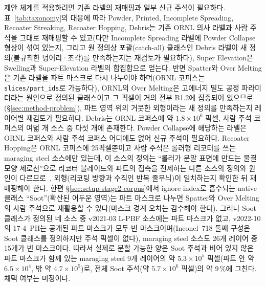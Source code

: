 제안 체계를 적용하려면 기존 라벨의 재매핑과 일부 신규 주석이 필요하다.
표~\ref{tab:taxonomy}의 대응에 따라 Powder, Printed, Incomplete
Spreading, Recoater Streaking, Recoater Hopping, Debris는 기존 ORNL 의사
라벨과 사람 주석을 그대로 재매핑할 수 있고(다만 Incomplete Spreading
라벨에 Powder Collapse 형상이 섞여 있는지, 그리고 원 정의상
포괄(catch-all) 클래스인 Debris 라벨이 새 정의(불규칙한 덩어리·조각)를
만족하는지는 재검토가 필요하다), Super
Elevation은 Swelling과 Super-Elevation 라벨의 합집합으로 얻는다. 반면
Spatter와 Over Melting은 기존 라벨을 파트 마스크로 다시 나누어야
하며(ORNL 코퍼스는 \texttt{slices/part\_ids}로 가능하다), ORNL의 Over
Melting은 고에너지 밀도 공정 파라미터라는 원인으로 정의된 클래스이고 그
픽셀이 거의 전부 B1.2에 집중되어 있으므로(\S\ref{sec:method-problem}),
파트 영역 위의 거뭇한 외형이라는 새 정의를 만족하는지 레이어별 재검토가
필요하다. Debris는
ORNL 코퍼스에 약 $1.8 \times 10^{6}$ 픽셀, 사람 주석 코퍼스의 여덟 개
소스 중 다섯 개에 존재한다. Powder Collapse에 해당하는 라벨은 ORNL
코퍼스와 사람 주석 코퍼스 어디에도 없어 신규 주석이 필요하다. Recoater
Hopping은 ORNL 코퍼스에 25픽셀뿐이고 사람 주석은 롤러형 리코터를 쓰는
maraging steel 소스에만 있는데, 이 소스의 정의는 ``롤러가 분말 표면에
만드는 물결 모양 세로선''으로 리코터 블레이드와 파트의 접촉을 전제하는
다른 소스의 정의와 원인이 다르므로~\cite{Peregrine_v2022_10},
외형(리코팅 방향과 수직인 반복 줄무늬)이 일치하는지 확인한 뒤
재매핑해야 한다. 한편 \S\ref{sec:setup-stage2-corpus}에서 ignore
index로 흡수되는 native 클래스 ``Soot''(확산된 어두운 영역)는 파트
마스크로 나누면 Spatter와 Over Melting의 사람 주석으로 재활용할 수
있다(마스크 경계 오차는 감수해야 한다). 그러나
Soot 클래스가 정의된 네 소스 중 v2021-03 L-PBF 소스에는 파트 마스크가
없고, v2022-10의 17-4~PH는 공개된 파트 마스크가 모두 빈
마스크이며(Inconel~718 둘째 구성은 Soot 클래스를 정의하지만 주석 픽셀이
없다), maraging steel 소스도 26개 레이어 중 15개가 빈 마스크이다.
따라서 실제로 분할 가능한 양은 Soot 주석과 비어 있지 않은 파트 마스크가
함께 있는 maraging steel 9개 레이어의 약 $5.3 \times 10^{5}$ 픽셀(파트
안 약 $6.5 \times 10^{4}$, 밖 약 $4.7 \times 10^{5}$)로, 전체 Soot
주석(약 $5.7 \times 10^{6}$ 픽셀)의 약 9\,\%에 그친다. 채택 여부는
미정이다.

